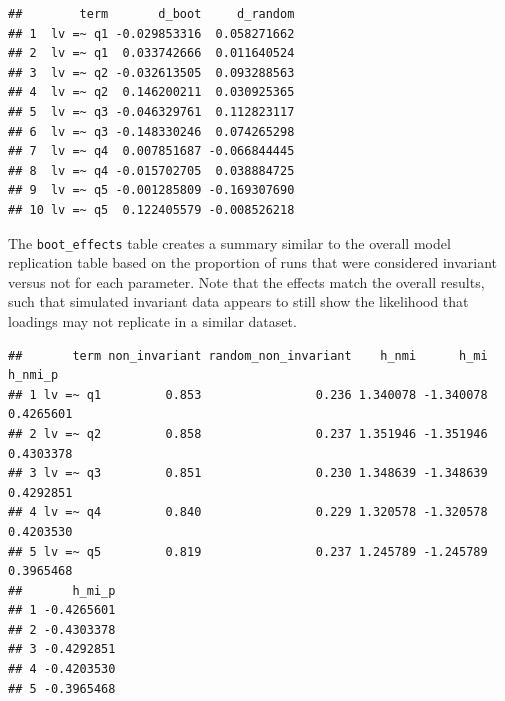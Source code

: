 \documentclass[
  man]{apa7}
\newenvironment{Shaded}{\begin{snugshade}}{\end{snugshade}}
\newcommand{\FunctionTok}[1]{\textcolor[rgb]{0.13,0.29,0.53}{\textbf{#1}}}
\newcommand{\NormalTok}[1]{#1}
\newcommand{\SpecialCharTok}[1]{\textcolor[rgb]{0.81,0.36,0.00}{\textbf{#1}}}
\begin{document}
\small

\begin{Shaded}
\end{Shaded}

\normalsize

\begin{verbatim}
##        term       d_boot     d_random
## 1  lv =~ q1 -0.029853316  0.058271662
## 2  lv =~ q1  0.033742666  0.011640524
## 3  lv =~ q2 -0.032613505  0.093288563
## 4  lv =~ q2  0.146200211  0.030925365
## 5  lv =~ q3 -0.046329761  0.112823117
## 6  lv =~ q3 -0.148330246  0.074265298
## 7  lv =~ q4  0.007851687 -0.066844445
## 8  lv =~ q4 -0.015702705  0.038884725
## 9  lv =~ q5 -0.001285809 -0.169307690
## 10 lv =~ q5  0.122405579 -0.008526218
\end{verbatim}

The \texttt{boot\_effects} table creates a summary similar to the overall model replication table based on the proportion of runs that were considered invariant versus not for each parameter. Note that the effects match the overall results, such that simulated invariant data appears to still show the likelihood that loadings may not replicate in a similar dataset.

\small

\begin{Shaded}
\end{Shaded}

\normalsize

\begin{verbatim}
##       term non_invariant random_non_invariant    h_nmi      h_mi   h_nmi_p
## 1 lv =~ q1         0.853                0.236 1.340078 -1.340078 0.4265601
## 2 lv =~ q2         0.858                0.237 1.351946 -1.351946 0.4303378
## 3 lv =~ q3         0.851                0.230 1.348639 -1.348639 0.4292851
## 4 lv =~ q4         0.840                0.229 1.320578 -1.320578 0.4203530
## 5 lv =~ q5         0.819                0.237 1.245789 -1.245789 0.3965468
##       h_mi_p
## 1 -0.4265601
## 2 -0.4303378
## 3 -0.4292851
## 4 -0.4203530
## 5 -0.3965468
\end{verbatim}
\end{document}
